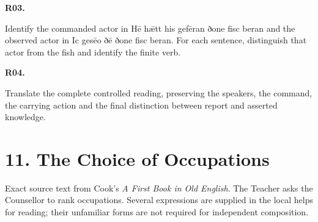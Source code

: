 \par\begin{minipage}{\linewidth}\raggedright
\textbf{R03.}

Identify the commanded actor in Hē hǣtt his gefēran ðone fisc beran and the observed actor in Ic gesēo ðē ðone fisc beran. For each sentence, distinguish that actor from the fish and identify the finite verb.

\end{minipage}\par\addvspace{4pt}

\par\begin{minipage}{\linewidth}\raggedright
\textbf{R04.}

Translate the complete controlled reading, preserving the speakers, the command, the carrying action and the final distinction between report and asserted knowledge.

\end{minipage}\par\addvspace{4pt}

\section*{11. The Choice of Occupations}

Exact source text from Cook’s \emph{A First Book in Old English}. The Teacher asks the Counsellor to rank occupations. Several expressions are supplied in the local helps for reading; their unfamiliar forms are not required for independent composition.

\par\begin{minipage}{\linewidth}\raggedright




\end{minipage}\par
{}
